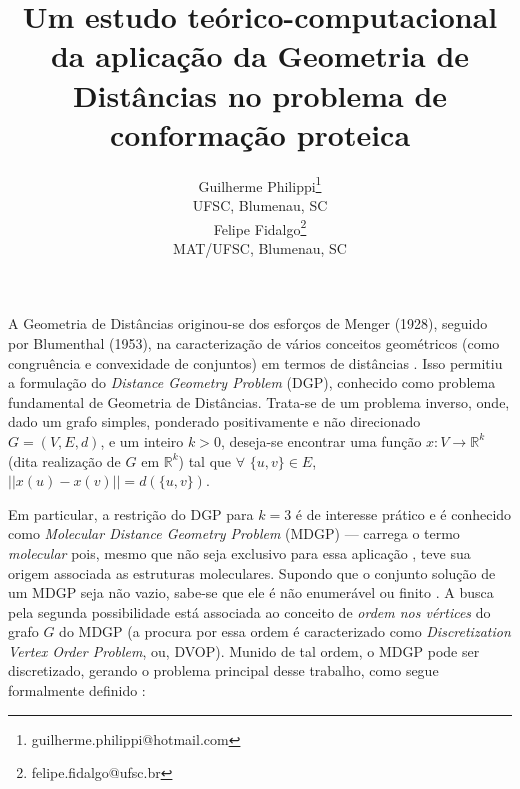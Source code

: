 \documentclass[a4,11pt]{pssbmac}
\begin{document}
	
	\title{Um estudo teórico-computacional da aplicação da Geometria de Distâncias no problema de conformação proteica}
	
	\author{
		{\large Guilherme Philippi}\thanks{guilherme.philippi@hotmail.com}\\
		{\small UFSC, Blumenau, SC} \\
		{\large Felipe Fidalgo}\thanks{felipe.fidalgo@ufsc.br} \\
		{\small MAT/UFSC, Blumenau, SC} \\
	}
	\criartitulo
	
	A Geometria de Distâncias originou-se dos esforços de Menger (1928), seguido por Blumenthal (1953), na caracterização de vários conceitos geométricos (como congruência e convexidade de conjuntos) em termos de distâncias \cite{carlileGDandAplications}. Isso permitiu a formulação do \textit{Distance Geometry Problem} (DGP), conhecido como problema fundamental de Geometria de Distâncias. Trata-se de um problema inverso, onde, dado um grafo simples, ponderado positivamente e não direcionado $G=(V,E, d)$, e um inteiro $k>0$, deseja-se encontrar uma função $x:V\rightarrow\mathbb{R}^k$ (dita realização de $G$ em $\mathbb{R}^k$) tal que $\forall$ $\{u,v\} \in E$, $||x(u) - x(v)|| = d(\{u,v\})$. 
	
	Em particular, a restrição do DGP para $k = 3$ é de interesse prático e é conhecido como \textit{Molecular Distance Geometry Problem} (MDGP) --- carrega o termo \textit{molecular} pois, mesmo que não seja exclusivo para essa aplicação \cite{carlileGDandAplications}, teve sua origem associada as estruturas moleculares. Supondo que o conjunto solução de um MDGP seja não vazio, sabe-se que ele é não enumerável ou finito \cite{carlileBook31Coloquio}. A busca pela segunda possibilidade está associada ao conceito de \textit{ordem nos vértices} do grafo $G$ do MDGP (a procura por essa ordem é caracterizado como \textit{Discretization Vertex Order Problem}, ou, DVOP). Munido de tal ordem, o MDGP pode ser discretizado, gerando o problema principal desse trabalho, como segue formalmente definido \cite{carlileBook31Coloquio}: %
	
\end{document}
